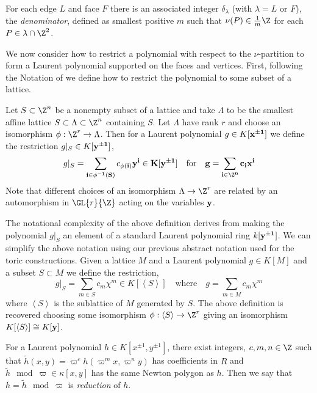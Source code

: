 \begin{defn}
For each edge $L$ and face $F$ there is an associated integer $\delta_\lambda$ (with $\lambda = L$ or $F$), the \textit{denominator}, defined as smallest positive $m$ such that $\nu(P) \in \frac{1}{m} \Z$ for each $P \in \lambda \cap \Z^2$. 
\end{defn}

\begin{rmk}
We now consider how to restrict a polynomial with respect to the $\nu$-partition to form a Laurent polynomial supported on the faces and vertices. First, following the Notation of \cite{tim} we define how to restrict the polynomial to some subset of a lattice.
\end{rmk}

\begin{defn}[Restriction]
Let $S \subset \Z^n$ be a nonempty subset of a lattice and take $\Lambda$ to be the smallest affine lattice $S \subset \Lambda \subset \Z^n$ containing $S$. Let $\Lambda$ have rank $r$ and choose an isomorphism $\phi : \Z^r \to \Lambda$. Then for a Laurent polynomial $g \in K[\bf{x}^{\pm 1}]$ we define the restriction $g|_S \in K[\bf{y}^{\pm 1}]$,
\[ g|_S = \sum_{\bf{i} \in \phi^{-1}(S)} c_{\phi(\bf{i})} \bf{y}^{\bf{i}} \in K[\bf{y}^{\pm 1}] \quad \text{for} \quad g = \sum_{\bf{i} \in \Z^n} c_{\bf{i}} \bf{x}^{\bf{i}} \]
Note that different choices of an isomorphism $\Lambda \to \Z^r$ are related by an automorphism in $\GL{r}{\Z}$ acting on the variables $\bf{y}$. 
\end{defn}

\begin{rmk}
The notational complexity of the above definition derives from making the polynomial $g|_S$ an element of a standard Laurent polynomial ring $k[\bf{y}^{\pm 1}]$. We can simplify the above notation using our previous abstract notation used for the toric constructions. Given a lattice $M$ and a Laurent polynomial $g \in K[M]$ and a subset $S \subset M$ we define the restriction,
\[ g|_S = \sum_{m \in S} c_m \chi^m \in K[\left< S \right>] \quad \text{where} \quad g = \sum_{m \in M} c_m \chi^m \]
where $\left< S \right>$ is the sublattice of $M$ generated by $S$. The above definition is recovered choosing some isomorphism $\phi : \left< S \right> \to \Z^r$ giving an isomorphism $K[\left< S \right>] \cong K[\bf{y}]$. 
\end{rmk}

\begin{defn}[Reduction]
For a Laurent polynomial $h \in K[x^{\pm 1}, y^{\pm 1}]$, there exist integers, $c, m, n \in \Z$ such that $\tilde{h}(x, y) = \varpi^c h(\varpi^m x, \varpi^n y)$ has coefficients in $R$ and $\tilde{h} \mod \varpi \in \kappa[x, y]$ has the same Newton polygon as $h$. Then we say that $\overline{h} = \tilde{h} \mod \varpi$ is \textit{reduction} of $h$. 
\end{defn}

